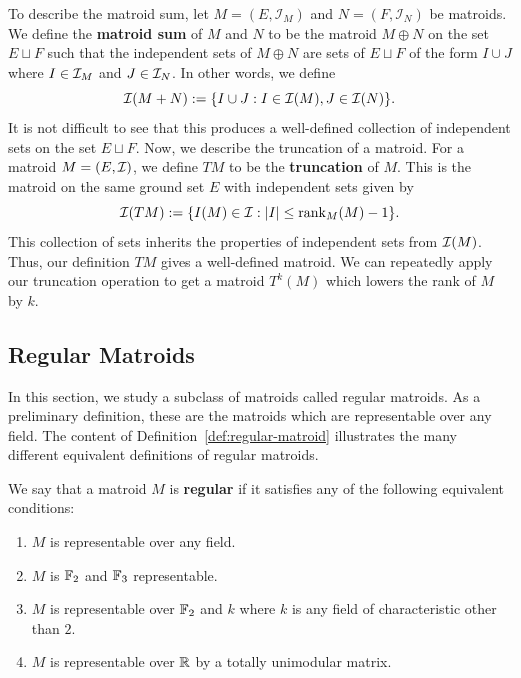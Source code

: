 \documentclass{puthesis-UG}
\begin{document}
To describe the matroid sum, let $M = (E, \mathcal{I}_M)$ and $N = (F, \mathcal{I}_N)$ be matroids. We define the \textbf{matroid sum} of $M$ and $N$ to be the matroid $M \oplus N$ on the set $E \sqcup F$ such that the independent sets of $M\oplus N$ are sets of $E \sqcup F$ of the form $I \cup J$ where $I \in \mathcal{I}_M$ and $J \in \mathcal{I}_N$. In other words, we define
\[
	\mathcal{I}(M+N) := \{I \cup J : I \in \mathcal{I}(M), J \in \mathcal{I}(N)\}.
\]
It is not difficult to see that this produces a well-defined collection of independent sets on the set $E \sqcup F$. Now, we describe the truncation of a matroid. For a matroid $M = (E, \mathcal{I})$, we define $TM$ to be the \textbf{truncation} of $M$. This is the matroid on the same ground set $E$ with independent sets given by 
\[
	\mathcal{I}(TM) := \{I(M)\in \mathcal{I} : |I| \leq \operatorname{rank}_M(M) - 1\}.
\]
This collection of sets inherits the properties of independent sets from $\mathcal{I}(M)$. Thus, our definition $TM$ gives a well-defined matroid. We can repeatedly apply our truncation operation to get a matroid $T^k(M)$ which lowers the rank of $M$ by $k$. 

\subsection{Regular Matroids} \label{sec:regular-matroids}

In this section, we study a subclass of matroids called regular matroids. As a preliminary definition, these are the matroids which are representable over any field. The content of Definition~\ref{def:regular-matroid} illustrates the many different equivalent definitions of regular matroids. 

\begin{defn} \label{def:regular-matroid}
	We say that a matroid $M$ is \textbf{regular} if it satisfies any of the following equivalent conditions:
	\begin{enumerate}[label = (\alph*)]
		\item $M$ is representable over any field. 
		\item $M$ is $\mathbb{F}_2$ and $\mathbb{F}_3$ representable. 
		\item $M$ is representable over $\mathbb{F}_2$ and $k$ where $k$ is any field of characteristic other than $2$.
		\item $M$ is representable over $\mathbb{R}$ by a totally unimodular matrix. 
	\end{enumerate}
\end{defn}
\end{document}
